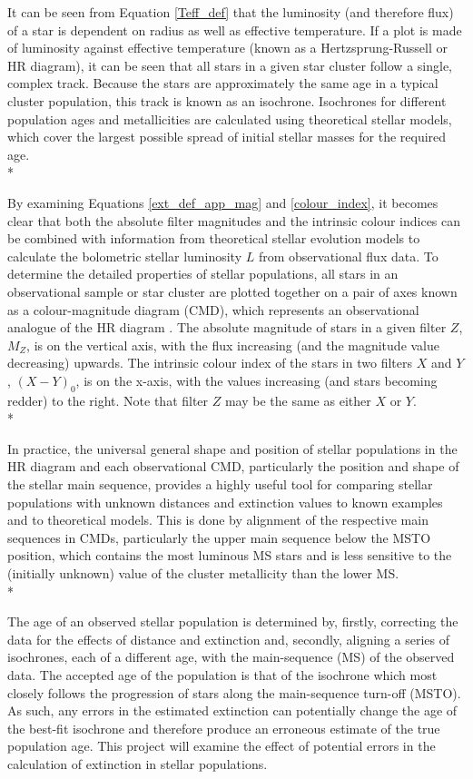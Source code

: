\documentclass[12pt, a4paper]{report}
\begin{document}
It can be seen from Equation \ref{Teff_def} that the luminosity (and therefore flux) of a star is dependent on radius as well as effective temperature. If a plot is made of luminosity against effective temperature (known as a Hertzsprung-Russell or HR diagram), it can be seen that all stars in a given star cluster follow a single, complex track. Because the stars are approximately the same age in a typical cluster population, this track is known as an isochrone. Isochrones for different population ages and metallicities are calculated using theoretical stellar models, which cover the largest possible spread of initial stellar masses for the required age.\\*

By examining Equations \ref{ext_def_app_mag} and \ref{colour_index}, it becomes clear that both the absolute filter magnitudes and the intrinsic colour indices can be combined with information from theoretical stellar evolution models to calculate the bolometric stellar luminosity $L$ from observational flux data. To determine the detailed properties of stellar populations, all stars in an observational sample or star cluster are plotted together on a pair of axes known as a colour-magnitude diagram (CMD), which represents an observational analogue of the HR diagram \citep{2005ARA&A..43..293B}. The absolute magnitude of stars in a given filter $Z$, $M_{Z}$, is on the vertical axis, with the flux increasing (and the magnitude value decreasing) upwards. The intrinsic colour index of the stars in two filters $X$ and $Y$, $(X-Y)_{0}$, is on the x-axis, with the values increasing (and stars becoming redder) to the right. Note that filter $Z$ may be the same as either $X$ or $Y$.\\*

In practice, the universal general shape and position of stellar populations in the HR diagram and each observational CMD, particularly the position and shape of the stellar main sequence, provides a highly useful tool for comparing stellar populations with unknown distances and extinction values to known examples and to theoretical models. This is done by alignment of the respective main sequences in CMDs, particularly the upper main sequence below the MSTO position, which contains the most luminous MS stars and is less sensitive to the (initially unknown) value of the cluster metallicity than the lower MS. \\*

The age of an observed stellar population is determined by, firstly, correcting the data for the effects of distance and extinction and, secondly, aligning a series of isochrones, each of a different age, with the main-sequence (MS) of the observed data. The accepted age of the population is that of the isochrone which most closely follows the progression of stars along the main-sequence turn-off (MSTO). As such, any errors in the estimated extinction can potentially change the age of the best-fit isochrone and therefore produce an erroneous estimate of the true population age. This project will examine the effect of potential errors in the calculation of extinction in stellar populations.
\end{document}
